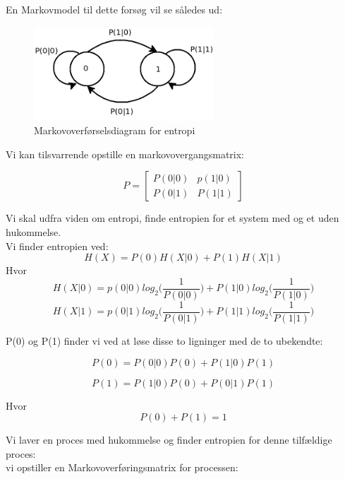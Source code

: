 En Markovmodel til dette forsøg vil se således ud:
 \begin{figure}[!h]
	\centering
	\includegraphics[width=0.6\textwidth]{resources/part2_entropi_diagram}
	\caption{Markovoverførselsdiagram for entropi }
	\label{fig:part2_7}
\end{figure}

Vi kan tilsvarrende opstille en markovovergangsmatrix:


\[ P =\left[ \begin{array}{ccc}
P(0|0) & p(1|0)  \\
P(0|1) & P(1|1) \end{array} \right]\] 

Vi skal udfra viden om entropi, finde entropien for et system med og et uden hukommelse.\\
Vi finder entropien ved:
\begin{equation}
H(X) = P(0)H(X|0)+P(1)H(X|1)
\end{equation}
Hvor
\begin{equation}
H(X|0)=p(0|0)log_2 \bigg(\frac{1}{P(0|0)}\bigg)+P(1|0)log_2\bigg(\frac{1}{P(1|0)}\bigg)
\end{equation}
\begin{equation}
H(X|1)=p(0|1)log_2 \bigg(\frac{1}{P(0|1)}\bigg)+P(1|1)log_2\bigg(\frac{1}{P(1|1)}\bigg)
\end{equation}

P(0) og P(1) finder vi ved at løse disse to ligninger med de to ubekendte:

\begin{equation}
P(0) = P(0|0)P(0)+P(1|0)P(1)
\end{equation}

\begin{equation}
P(1)=P(1|0)P(0)+P(0|1)P(1)
\end{equation}

Hvor
\begin{equation}
P(0)+P(1)=1
\end{equation}

Vi laver en proces med hukommelse og finder entropien for denne tilfældige proces:\\ vi opstiller en Markovoverføringsmatrix for processen:

